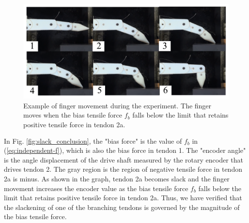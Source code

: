 \documentclass{llncs}
\begin{document}
	\begin{figure}[tb]
		\centering
		\includegraphics[width=.90\textwidth]{./figure/frame1733r60b180.pdf}
		\caption{Example of finger movement during the experiment. The finger moves when the bias tensile force $f_b$ falls below the limit that retains positive tensile force in tendon 2a.}
		\label{pic:example_slack}
	\end{figure}
In Fig. \ref{fig:slack_conclusion}, the "bias force" is the value of $f_b$ in (\ref{eq:independent-f}), which is also the bias force in tendon 1.
The "encoder angle" is the angle displacement of the drive shaft measured by the rotary encoder that drives tendon 2.
The gray region is the region of negative tensile force in tendon 2a is minus.
As shown in the graph, tendon 2a becomes slack and the finger movement increases the encoder value as the bias tensile force $f_b$ falls below the limit that retains positive tensile force in tendon 2a.
Thus, we have verified that the slackening of one of the branching tendons is governed by the magnitude of the bias tensile force.

	
\end{document}
